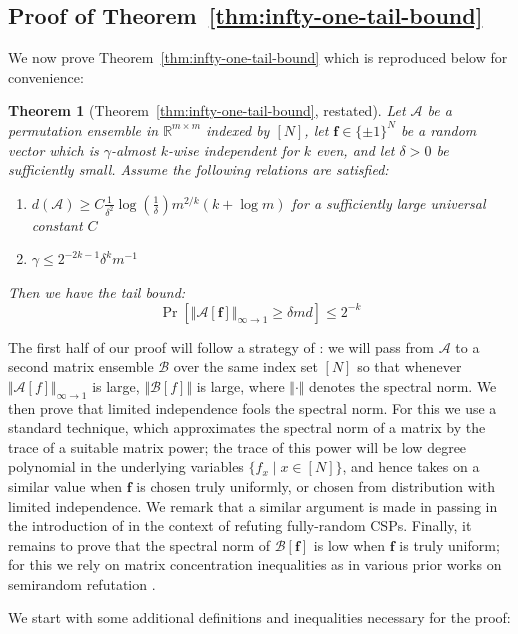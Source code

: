 \documentclass[11pt]{article}
\newtheorem*{theorem*}{Theorem}
\newcommand{\norm}[1]{\Vert #1 \Vert}
\newcommand{\N}{[N]}
\begin{document}
\subsection{Proof of Theorem~\ref{thm:infty-one-tail-bound}}\label{subsec:infty-to-one-tail}
We now prove Theorem~\ref{thm:infty-one-tail-bound} which is reproduced below for convenience:
\begin{theorem*}[Theorem~\ref{thm:infty-one-tail-bound}, restated]
Let $\mathcal{A}$ be a permutation ensemble in $\mathbb{R}^{m \times m}$ indexed by $\N$, let $\bm{f} \in \{\pm 1\}^N$ be a random vector which is $\gamma$-almost $k$-wise independent for $k$ even, and let $\delta > 0$ be sufficiently small. Assume the following relations are satisfied:
\begin{enumerate}
	\item $d(\mathcal{A})\geq   C\frac{1}{\delta^2} \log(\frac{1}{\delta}) m^{2/k}(k+\log m )$ for a sufficiently large universal constant $C$
	\item $\gamma \leq 2^{-2k-1}\delta^km^{-1}$ 
\end{enumerate}
Then we have the tail bound:
\[
\Pr[\norm{\mathcal{A}[\bm{f}]}_{\infty \to 1} \geq \delta m d] \leq 2^{-k}
\]
\end{theorem*}
The first half of our proof will follow a strategy of \cite{simpler-moore}: we will pass from $\mathcal{A}$ to a second matrix ensemble $\mathcal{B}$ over the same index set $\N$ so that whenever $\norm{\mathcal{A}[f]}_{\infty\to 1}$ is large, $\norm{\mathcal{B}[f]}$ is large, where $\norm{\cdot}$ denotes the spectral norm. We then prove that limited independence fools the spectral norm. For this we use a standard technique, which approximates the spectral norm of a matrix by the trace of a suitable matrix power; the trace of this power will be low degree polynomial in the underlying variables $\{f_x \mid x \in \N\}$, and hence takes on a similar value when $\bm{f}$ is chosen truly uniformly, or chosen from distribution with limited independence. We remark that a similar argument is made in passing in the introduction of \cite{luca} in the context of refuting fully-random CSPs. Finally, it remains to prove that the spectral norm of $\mathcal{B}[\bm{f}]$ is low when $\bm{f}$ is truly uniform; for this we rely on matrix concentration inequalities as in various prior works on semirandom refutation \cite{semirandom,smoothed}.

We start with some additional definitions and inequalities necessary for the proof:
\end{document}

